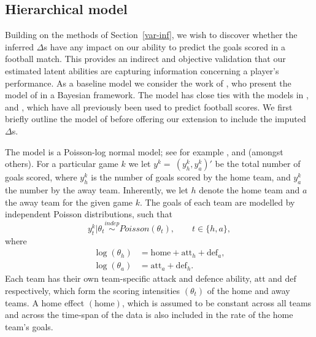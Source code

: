 \documentclass[11pt,a4paper]{article}
\newcommand{\indep}{\overset{indep}{\sim }}
\begin{document}
    \subsection{Hierarchical model} \label{hier}

Building on the methods of Section~\ref{var-inf}, we wish to 
discover whether the inferred $\Delta$s have any impact on our 
ability to predict the goals scored in a football match. This provides an indirect
and objective validation that our estimated latent abilities are capturing information concerning a player's performance. As a 
baseline model we consider the work of \cite{baio_2010}, who present 
the model of \cite{karlis_2003} in a Bayesian framework. The model has 
close ties with the models in \cite{dixon_1997}, \cite{lee_1997} and \cite{karlis_2000}, which have 
all previously been used to predict football scores. We first briefly 
outline the model of \cite{baio_2010} before offering our extension 
to include the imputed $\Delta$s.

The model is a Poisson-log normal model; see for example 
\cite{aitchison_1989}, \cite{chib_2001} and \cite{tunaru_2002} (amongst 
others). For a particular game $k$ we let $y^k=~(y^k_h,y^k_a)'$ 
be the total number of goals scored, where $y^k_h$ is the number of 
goals scored by the home team, and $y^k_a$ the number by the away 
team. Inherently, we let $h$ denote the home team and $a$ the away 
team for the given game $k$. The goals of each team are modelled by 
independent Poisson distributions, such that 
\begin{equation}\label{hier_pois}
y_t^k\vert\theta_t\indep Poisson\left(\theta_t \right), \qquad t\in\{h,a\},
\end{equation} 
where 
\begin{align}
\log{\left(\theta_h\right)} &= \textrm{home} + \textrm{att}_h +\textrm{def}_a, \label{theta_h}\\ 
\log{\left(\theta_a\right)} &= \textrm{att}_a + \textrm{def}_h. \label{theta_a}
\end{align}
Each team has their own team-specific attack and defence ability, 
$\textrm{att}$ and $\textrm{def}$ respectively, which form the scoring 
intensities $(\theta_t)$ of the home and away teams. A home 
effect $(\textrm{home})$, which is assumed to be constant across all 
teams and across the time-span of the data is also included in the 
rate of the home team's goals. 
\end{document}
